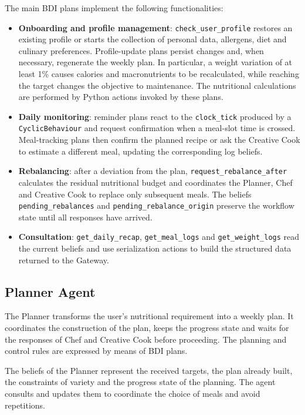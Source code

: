 \documentclass[12pt,a4paper]{article}
\begin{document}
The main BDI plans implement the following functionalities:
\begin{itemize}
    \item \textbf{Onboarding and profile management}: \texttt{check\_user\_profile} restores an existing profile or starts the collection of personal data, allergens, diet and culinary preferences. Profile-update plans persist changes and, when necessary, regenerate the weekly plan. In particular, a weight variation of at least 1\% causes calories and macronutrients to be recalculated, while reaching the target changes the objective to maintenance. The nutritional calculations are performed by Python actions invoked by these plans.
    \item \textbf{Daily monitoring}: reminder plans react to the \texttt{clock\_tick} produced by a \texttt{CyclicBehaviour} and request confirmation when a meal-slot time is crossed. Meal-tracking plans then confirm the planned recipe or ask the Creative Cook to estimate a different meal, updating the corresponding log beliefs.
    \item \textbf{Rebalancing}: after a deviation from the plan, \texttt{request\_rebalance\_after} calculates the residual nutritional budget and coordinates the Planner, Chef and Creative Cook to replace only subsequent meals. The beliefs \texttt{pending\_rebalances} and \texttt{pending\_rebalance\_origin} preserve the workflow state until all responses have arrived.
    \item \textbf{Consultation}: \texttt{get\_daily\_recap}, \texttt{get\_meal\_logs} and \texttt{get\_weight\_logs} read the current beliefs and use serialization actions to build the structured data returned to the Gateway.
\end{itemize}


\subsection{Planner Agent}

The Planner transforms the user's nutritional requirement into a weekly plan. It coordinates the
construction of the plan, keeps the progress state and waits for the responses of Chef and Creative
Cook before proceeding. The planning and control rules are expressed by means of BDI plans.

The beliefs of the Planner represent the received targets, the plan already built, the constraints of
variety and the progress state of the planning. The agent consults and updates them to
coordinate the choice of meals and avoid repetitions.
\end{document}
